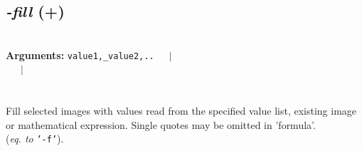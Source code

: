 \documentclass[a4paper,11pt,twoside]{book}
\begin{document}
\subsection{\emph{-fill} (+)}\vspace*{-0.5em}
~\\\textbf{Arguments: } 
{\small \texttt{value1,\_value2,..}}~~~$|$\\
\hspace*{2.2cm}{\small \texttt{[image]}}~~~$|$\\
\\~\\
Fill selected images with values read from the specified value list, existing image
or mathematical expression. Single quotes may be omitted in 'formula'.
~\\(\emph{eq. to} {\small \texttt{'-f'}}).
\end{document}
